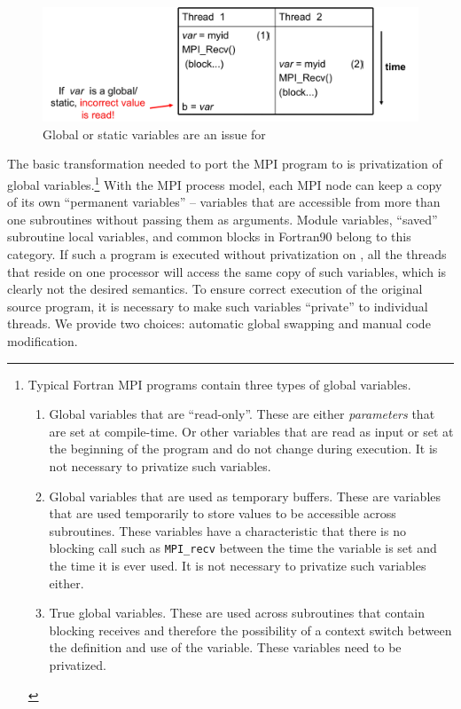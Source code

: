 \documentclass[10pt]{article}
\begin{document}
\begin{figure}[h]
\centering
\includegraphics[width=4.6in]{figs/global.png}
\caption{Global or static variables are an issue for \ampi{}}
\label{fig_global}
\end{figure}

The basic transformation needed to port the MPI program to \ampi{} is
privatization of global variables.\footnote{Typical Fortran MPI programs
contain three types of global variables.

\begin{enumerate}

\item Global variables that are ``read-only''. These are either
\emph{parameters} that are set at compile-time. Or other variables that are
read as input or set at the beginning of the program and do not change during
execution. It is not necessary to privatize such variables.

\item Global variables that are used as temporary buffers. These are variables
that are used temporarily to store values to be accessible across subroutines.
These variables have a characteristic that there is no blocking call such as
\texttt{MPI\_recv} between the time the variable is set and the time it is ever
used. It is not necessary to privatize such variables either. 

\item True global variables. These are used across subroutines that contain
blocking receives and therefore the possibility of a context switch between the
definition and use of the variable. These variables need to be privatized.

\end{enumerate}
}
With the MPI process model, each MPI node can keep a copy of its own
``permanent variables'' -- variables that are accessible from more than one
subroutines without passing them as arguments.  Module variables, ``saved''
subroutine local variables, and common blocks in Fortran90 belong to this
category. If such a program is executed without privatization on \ampi{}, all
the \ampi{} threads that reside on one processor will access the same copy of
such variables, which is clearly not the desired semantics.  To ensure correct
execution of the original source program, it is necessary to make such
variables ``private'' to individual threads. We provide two choices: automatic 
global swapping and manual code modification.
\end{document}
